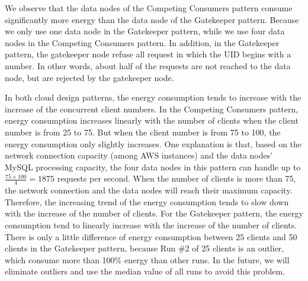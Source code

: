 \documentclass{article}
\begin{document}
We observe that the data nodes of the Competing Consumers pattern consume significantly more energy than the data node of the Gatekeeper pattern. Because we only use one data node in the Gatekeeper pattern, while we use four data nodes in the Competing Consumers pattern. In addition, in the Gatekeeper pattern, the gatekeeper node refuse all request in which the UID begins with a number. In other words, about half of the requests are not reached to the data node, but are rejected by the gatekeeper node.

In both cloud design patterns, the energy consumption tends to increase with the increase of the concurrent client numbers. In the Competing Consumers pattern, energy consumption increases linearly with the number of clients when the client number is from 25 to 75. But when the client number is from 75 to 100, the energy consumption only slightly increases. One explanation is that, based on the network connection capacity (among AWS instances) and the data nodes' MySQL processing capacity, the four data nodes in this pattern can handle up to $\frac{75\times100}{4}=1875$ requests per second. When the number of clients is more than 75, the network connection and the data nodes will reach their maximum capacity. Therefore, the increasing trend of the energy consumption tends to slow down with the increase of the number of clients. For the Gatekeeper pattern, the energy consumption tend to linearly increase with the increase of the number of clients. There is only a little difference of energy consumption between 25 clients and 50 clients in the Gatekeeper pattern, because Run \#2 of 25 clients is an outlier, which consume more than 100\% energy than other runs. In the future, we will eliminate outliers and use the median value of all runs to avoid this problem.
\end{document}
